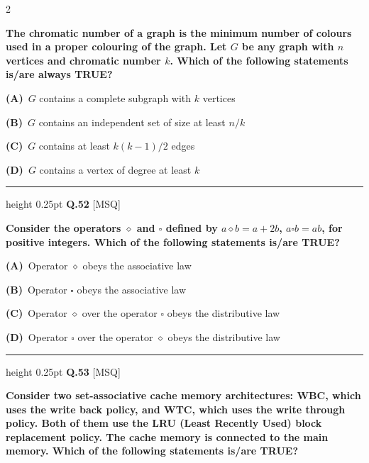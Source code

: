\documentclass[a4paper,10pt,twoside]{article}
\begin{document}
\begin{multicols}{2}
{\bfseries The chromatic number of a graph is the minimum number of colours used in a proper colouring of the graph. Let $G$ be any graph with $n$ vertices and chromatic number $k$. Which of the following statements is/are always TRUE? \par}
\par\vspace{2pt}\noindent
\textbf{(A)}~$G$ contains a complete subgraph with $k$ vertices\par\vspace{2pt}\noindent
\textbf{(B)}~$G$ contains an independent set of size at least $n/k$\par\vspace{2pt}\noindent
\textbf{(C)}~$G$ contains at least $k(k-1)/2$ edges\par\vspace{2pt}\noindent
\textbf{(D)}~$G$ contains a vertex of degree at least $k$
\par\vspace{6pt}\hrule height 0.25pt\vspace{6pt}
\noindent\textbf{Q.52} \hfill {\footnotesize\textsf{[MSQ]}}
\par\vspace{2pt}
{\bfseries Consider the operators $\diamond$ and $\square$ defined by $a \diamond b = a + 2b$, $a \square b = ab$, for positive integers. Which of the following statements is/are TRUE? \par}
\par\vspace{2pt}\noindent
\textbf{(A)}~Operator $\diamond$ obeys the associative law\par\vspace{2pt}\noindent
\textbf{(B)}~Operator $\square$ obeys the associative law\par\vspace{2pt}\noindent
\textbf{(C)}~Operator $\diamond$ over the operator $\square$ obeys the distributive law\par\vspace{2pt}\noindent
\textbf{(D)}~Operator $\square$ over the operator $\diamond$ obeys the distributive law
\par\vspace{6pt}\hrule height 0.25pt\vspace{6pt}
\noindent\textbf{Q.53} \hfill {\footnotesize\textsf{[MSQ]}}
\par\vspace{2pt}
{\bfseries Consider two set-associative cache memory architectures: WBC, which uses the write back policy, and WTC, which uses the write through policy. Both of them use the LRU (Least Recently Used) block replacement policy. The cache memory is connected to the main memory. Which of the following statements is/are TRUE? \par}

\end{multicols}
\end{document}
